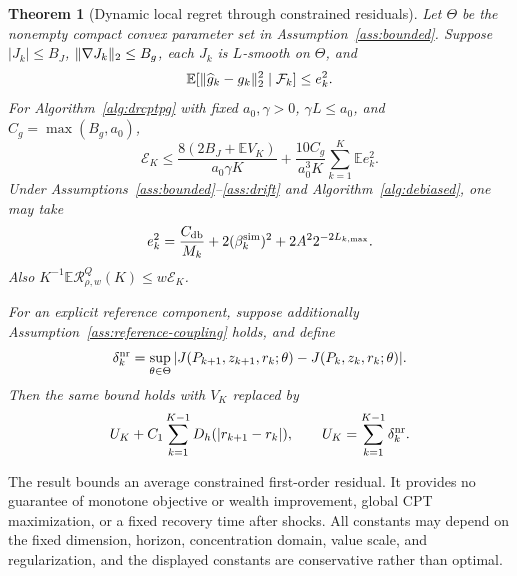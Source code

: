 \documentclass[11pt]{article}
\newtheorem{theorem}{Theorem}[section]
\newcommand{\E}{\mathbb E}
\newcommand{\1}{\mathbf 1}
\DeclarePairedDelimiter{\norm}{\lVert}{\rVert}
\newcommand{\cF}{\mathcal F}
\newcommand{\Reg}{\mathcal R}
\newcommand{\db}{\mathrm{db}}
\begin{document}
\begin{theorem}[Dynamic local regret through constrained residuals]\label{thm:dynamic-regret}
Let $\Theta$ be the nonempty compact convex parameter set in Assumption~\ref{ass:bounded}. Suppose $|J_k|\le B_J$, $\norm{\nabla J_k}_2\le B_g$, each $J_k$ is $L$-smooth on $\Theta$, and
\[
 \E[\norm{\widehat g_k-g_k}_2^2\mid\cF_k]\le e_k^2.
\]
For Algorithm~\ref{alg:drcptpg} with fixed $a_0,\gamma>0$, $\gamma L\le a_0$, and $C_g=\max(B_g,a_0)$,
\begin{equation}\label{eq:main-bound}
 \mathcal E_K\le
 \frac{8(2B_J+\E V_K)}{a_0\gamma K}
 +\frac{10C_g}{a_0^3K}\sum_{k=1}^K\E e_k^2.
\end{equation}
Under Assumptions~\ref{ass:bounded}--\ref{ass:drift} and Algorithm~\ref{alg:debiased}, one may take
\begin{equation}\label{eq:algorithm-mse-substitution}
 e_k^2=\frac{C_{\db}}{M_k}+2(\beta_k^{\rm sim})^2
 +2A^22^{-2L_{k,\max}}.
\end{equation}
Also $K^{-1}\E\Reg_{\rho,w}^{Q}(K)\le w\mathcal E_K$.

For an explicit reference component, suppose additionally Assumption~\ref{ass:reference-coupling} holds, and define
\begin{equation}\label{eq:nonreference-variation}
 \delta_k^{\rm nr}=\sup_{\theta\in\Theta}
 |J(P_{k+1},z_{k+1},r_k;\theta)-J(P_k,z_k,r_k;\theta)|.
\end{equation}
Then the same bound holds with $V_K$ replaced by
\begin{equation}\label{eq:reference-budget}
 U_K+C_1\sum_{k=1}^{K-1}D_h(|r_{k+1}-r_k|),
 \qquad U_K=\sum_{k=1}^{K-1}\delta_k^{\rm nr}.
\end{equation}
\end{theorem}
The result bounds an average constrained first-order residual. It provides no guarantee of monotone objective or wealth improvement, global CPT maximization, or a fixed recovery time after shocks. All constants may depend on the fixed dimension, horizon, concentration domain, value scale, and regularization, and the displayed constants are conservative rather than optimal.
\end{document}
